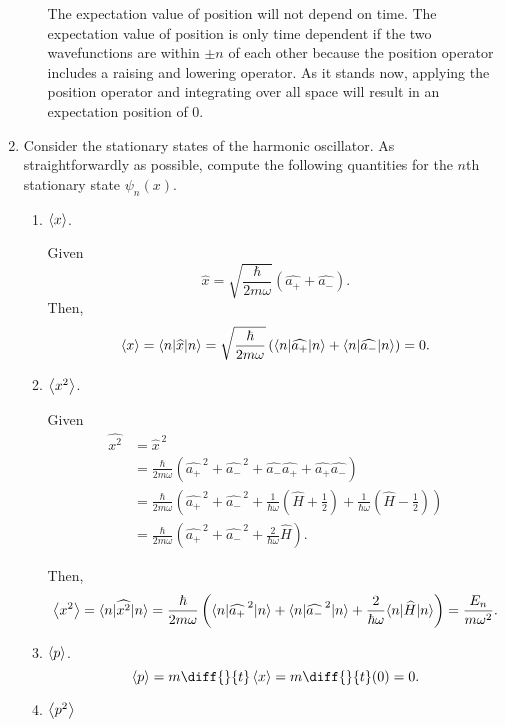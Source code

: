 \documentclass[a4paper, 12pt]{config/homework}
\begin{document}
\begin{enumerate}
\begin{enumerate}[label=(\alph*)]
The expectation value of position will not depend on time. The expectation value of position is only time dependent if the two wavefunctions are within \(\pm n\) of each other because the position operator includes a raising and lowering operator. As it stands now, applying the position operator and integrating over all space will result in an expectation position of 0.

\end{enumerate}

\pagebreak
\item Consider the stationary states of the harmonic oscillator. As straightforwardly as possible, compute the following quantities for the \(n\)th stationary state \(\psi_n(x)\).
\begin{enumerate}[label=(\alph*)]
\item \(\left\langle x \right\rangle\).

Given
\[\widehat{x} = \sqrt{\frac{\hbar}{2m\omega}}\left(\widehat{a_+} + \widehat{a_-}\right).\]
Then,
\[\expval{x}
= \bra*{n}\widehat{x}\ket*{n}
= \sqrt{\frac{\hbar}{2m\omega}}\left(\bra*{n}\widehat{a_+}\ket*{n} + \bra*{n}\widehat{a_-}\ket*{n}\right)
= 0.\]

\item \(\left\langle x^2 \right\rangle\).

Given
\begin{align*}
\widehat{x^2} &= \widehat{x}^{\,2}
\\&= \frac{\hbar}{2m\omega} \left(\widehat{a_+}^{\,2} + \widehat{a_-}^{\,2} + \widehat{a_-}\widehat{a_+} + \widehat{a_+}\widehat{a_-}\right)
\\&= \frac{\hbar}{2m\omega} \left(\widehat{a_+}^{\,2} + \widehat{a_-}^{\,2} + \frac{1}{\hbar \omega}\left(\widehat{H}+\frac{1}{2}\right) + \frac{1}{\hbar \omega}\left(\widehat{H}-\frac{1}{2}\right)\right)
\\&= \frac{\hbar}{2m\omega} \left(\widehat{a_+}^{\,2} + \widehat{a_-}^{\,2} + \frac{2}{\hbar \omega}\widehat{H}\right).
\end{align*}

Then,
\[\expval{x^2} = \bra*{n}\widehat{x^2}\ket*{n} = \frac{\hbar}{2m\omega} \left( \bra*{n}\widehat{a_+}^{\,2}\ket*{n} + \bra*{n}\widehat{a_-}^{\,2}\ket*{n} + \frac{2}{\hbar \omega}\bra*{n}\widehat{H}\ket*{n}\right) = \frac{E_n}{m\omega^2}.\]

\item \(\left\langle p \right\rangle\).
\[\expval{p} = m\diff{}{t}\expval{x} = m\diff{}{t}(0) = 0.\]

\item \(\left\langle p^2 \right\rangle\)


\end{enumerate}
\end{enumerate}
\end{document}
